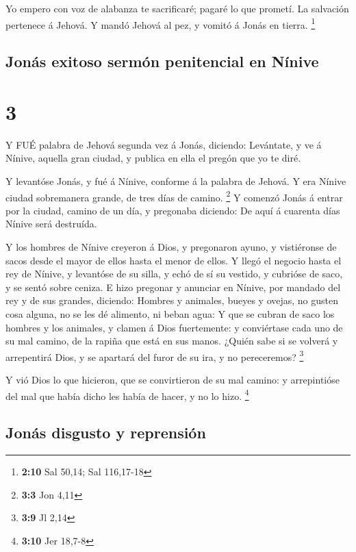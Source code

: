  Yo empero con voz de alabanza te sacrificaré; pagaré lo
que prometí. La salvación pertenece á Jehová. Y mandó Jehová al pez, y
vomitó á Jonás en tierra. \footnote{\textbf{2:10} Sal 50,14; Sal
  116,17-18}

\hypertarget{jonuxe1s-exitoso-sermuxf3n-penitencial-en-nuxednive}{%
\subsection{Jonás exitoso sermón penitencial en
Nínive}\label{jonuxe1s-exitoso-sermuxf3n-penitencial-en-nuxednive}}

\hypertarget{section-2}{%
\section{3}\label{section-2}}

 Y FUÉ palabra de Jehová segunda vez á Jonás, diciendo:
 Levántate, y ve á Nínive, aquella gran ciudad, y publica en
ella el pregón que yo te diré.

 Y levantóse Jonás, y fué á Nínive, conforme á la palabra de
Jehová. Y era Nínive ciudad sobremanera grande, de tres días de camino.
\footnote{\textbf{3:3} Jon 4,11}  Y comenzó Jonás á entrar
por la ciudad, camino de un día, y pregonaba diciendo: De aquí á
cuarenta días Nínive será destruída.

 Y los hombres de Nínive creyeron á Dios, y pregonaron
ayuno, y vistiéronse de sacos desde el mayor de ellos hasta el menor de
ellos.  Y llegó el negocio hasta el rey de Nínive, y
levantóse de su silla, y echó de sí su vestido, y cubrióse de saco, y se
sentó sobre ceniza.  E hizo pregonar y anunciar en Nínive,
por mandado del rey y de sus grandes, diciendo: Hombres y animales,
bueyes y ovejas, no gusten cosa alguna, no se les dé alimento, ni beban
agua:  Y que se cubran de saco los hombres y los animales, y
clamen á Dios fuertemente: y conviértase cada uno de su mal camino, de
la rapiña que está en sus manos.  ¿Quién sabe si se volverá
y arrepentirá Dios, y se apartará del furor de su ira, y no pereceremos?
\footnote{\textbf{3:9} Jl 2,14}

 Y vió Dios lo que hicieron, que se convirtieron de su mal
camino: y arrepintióse del mal que había dicho les había de hacer, y no
lo hizo. \footnote{\textbf{3:10} Jer 18,7-8}

\hypertarget{jonuxe1s-disgusto-y-reprensiuxf3n}{%
\subsection{Jonás disgusto y
reprensión}\label{jonuxe1s-disgusto-y-reprensiuxf3n}}


